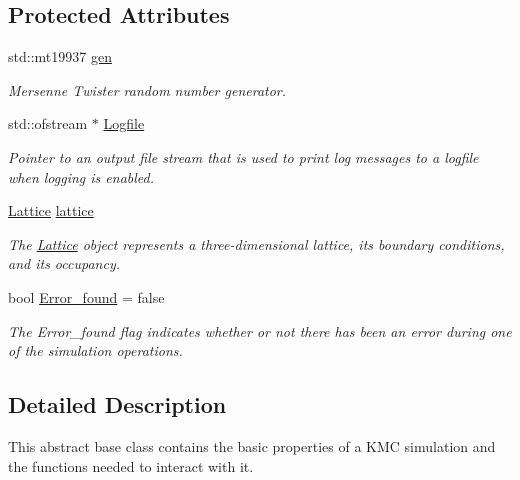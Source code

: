 \subsection*{Protected Attributes}
\begin{DoxyCompactItemize}
\item 
\mbox{\label{class_simulation_a80d697e885e6fa3a0ab688b25b366194}} 
std\+::mt19937 \hyperlink{class_simulation_a80d697e885e6fa3a0ab688b25b366194}{gen}
\begin{DoxyCompactList}\small\item\em Mersenne Twister random number generator. \end{DoxyCompactList}\item 
\mbox{\label{class_simulation_a741321a0bbc89d51b969abda469e6f96}} 
std\+::ofstream $\ast$ \hyperlink{class_simulation_a741321a0bbc89d51b969abda469e6f96}{Logfile}
\begin{DoxyCompactList}\small\item\em Pointer to an output file stream that is used to print log messages to a logfile when logging is enabled. \end{DoxyCompactList}\item 
\mbox{\label{class_simulation_afb2cf4feeb4d8292eeba8f9ef393c6a4}} 
\hyperlink{class_lattice}{Lattice} \hyperlink{class_simulation_afb2cf4feeb4d8292eeba8f9ef393c6a4}{lattice}
\begin{DoxyCompactList}\small\item\em The \hyperlink{class_lattice}{Lattice} object represents a three-\/dimensional lattice, its boundary conditions, and its occupancy. \end{DoxyCompactList}\item 
\mbox{\label{class_simulation_a7f4615a7898fb83d09be5e7fad92bb47}} 
bool \hyperlink{class_simulation_a7f4615a7898fb83d09be5e7fad92bb47}{Error\+\_\+found} = false
\begin{DoxyCompactList}\small\item\em The Error\+\_\+found flag indicates whether or not there has been an error during one of the simulation operations. \end{DoxyCompactList}\end{DoxyCompactItemize}


\subsection{Detailed Description}
This abstract base class contains the basic properties of a K\+MC simulation and the functions needed to interact with it. 

